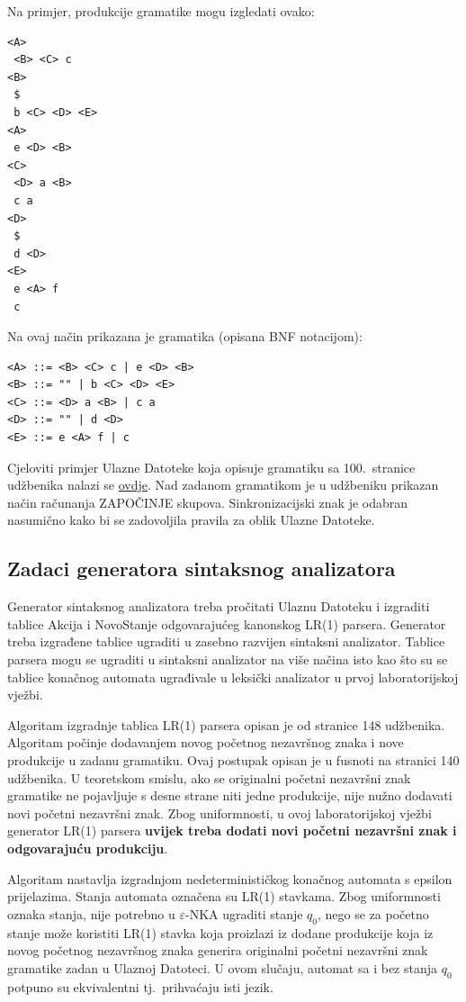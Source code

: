 \documentclass[times, 12pt, utf8]{book}
\begin{document}
Na primjer, produkcije gramatike mogu izgledati ovako:
\begin{lstlisting}[caption={Primjer produkcija gramatike.},label=lst:produkcije_gramatike_primjer]
<A>
 <B> <C> c
<B>
 $
 b <C> <D> <E>
<A>
 e <D> <B>
<C>
 <D> a <B>
 c a
<D>
 $
 d <D>
<E>
 e <A> f
 c
\end{lstlisting}

Na ovaj način prikazana je gramatika (opisana BNF notacijom):
\begin{lstlisting}[caption={Primjer produkcija gramatike u BNF notaciji.},label=lst:produkcije_gramatike_primjer_bnf]
<A> ::= <B> <C> c | e <D> <B>
<B> ::= "" | b <C> <D> <E>
<C> ::= <D> a <B> | c a
<D> ::= "" | d <D>
<E> ::= e <A> f | c
\end{lstlisting}

Cjeloviti primjer Ulazne Datoteke koja opisuje gramatiku sa 100.~stranice udžbenika nalazi se \href{https://github.com/fer-ppj/ppj-labosi/raw/master/res/lab2/gramatika100.san}{ovdje}.
Nad zadanom gramatikom je u udžbeniku prikazan način računanja ZAPOČINJE skupova.
Sinkronizacijski znak je odabran nasumično kako bi se zadovoljila pravila za oblik Ulazne Datoteke.

\subsection{Zadaci generatora sintaksnog analizatora}
Generator sintaksnog analizatora treba pročitati Ulaznu Datoteku i izgraditi tablice Akcija i NovoStanje odgovarajućeg kanonskog LR(1) parsera.
Generator treba izgrađene tablice ugraditi u zasebno razvijen sintaksni analizator.
Tablice parsera mogu se ugraditi u sintaksni analizator na više načina isto kao što su se tablice konačnog automata ugrađivale u leksički analizator u prvoj laboratorijskoj vježbi.

Algoritam izgradnje tablica LR(1) parsera opisan je od stranice 148 udžbenika.
Algoritam počinje dodavanjem novog početnog nezavršnog znaka i nove produkcije u zadanu gramatiku.
Ovaj postupak opisan je u fusnoti na stranici 140 udžbenika.
U teoretskom smislu, ako se originalni početni nezavršni znak gramatike ne pojavljuje s desne strane niti jedne produkcije, nije nužno dodavati novi početni nezavršni znak.
Zbog uniformnosti, u ovoj laboratorijskoj vježbi generator LR(1) parsera \textbf{uvijek treba dodati novi početni nezavršni znak i odgovarajuću produkciju}.

Algoritam nastavlja izgradnjom nedeterminističkog konačnog automata s epsilon prijelazima.
Stanja automata označena su LR(1) stavkama.
Zbog uniformnosti oznaka stanja, nije potrebno u $\varepsilon$-NKA ugraditi stanje $q_{0}$, nego se za početno stanje može koristiti LR(1) stavka koja proizlazi iz dodane produkcije koja iz novog početnog nezavršnog znaka generira originalni početni nezavršni znak gramatike zadan u Ulaznoj Datoteci.
U ovom slučaju, automat sa i bez stanja $q_{0}$ potpuno su ekvivalentni tj.~prihvaćaju isti jezik.
\end{document}
